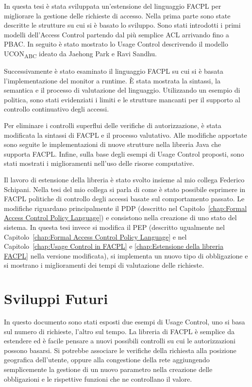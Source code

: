 \label{chap:Conclusioni}
In questa tesi è stata sviluppata un'estensione del linguaggio \ac{FACPL} per migliorare la gestione delle richieste di accesso.
Nella prima parte sono state descritte le strutture su cui si è basato lo sviluppo. Sono stati introdotti i primi modelli
dell'Access Control partendo dal più semplice \ac{ACL} arrivando fino a \ac{PBAC}. In seguito è stato mostrato lo Usage Control
descrivendo il modello UCON\textsubscript{ABC} ideato da Jaehong Park e Ravi Sandhu.

Successivamente è stato esaminato il linguaggio \ac{FACPL} su cui si è basata l'implementazione del monitor a runtime.
\MakeUppercase{è} stata mostrata la sintassi, la semantica e il processo di valutazione del linguaggio.
Utilizzando un esempio di politica, sono stati evidenziati i limiti e le strutture mancanti per
il supporto al controllo continuativo degli accessi.

Per eliminare i controlli superflui delle verifiche di autorizzazione, è stata modificata la sintassi di \ac{FACPL}
e il processo valutativo.
Alle modifiche apportate sono seguite le implementazioni di nuove strutture nella libreria Java
che supporta \ac{FACPL}.
Infine, sulla base degli esempi di Usage Control proposti, sono stati mostrati i miglioramenti nell'uso delle
risorse computative.

Il lavoro di estensione della libreria è stato svolto insieme al mio collega Federico Schipani. Nella tesi del
mio collega si parla di come è stato possibile esprimere in \ac{FACPL} politiche di controllo degli accessi basate
sul comportamento passato. Le modifiche riguardano principalmente il \ac{PDP} (descritto nel Capitolo~\ref{chap:Formal Access Control Policy Language})
e consistono nella creazione di uno stato del sistema. In questa tesi invece si modifica il \ac{PEP}
(descritto ugualmente nel Capitolo~\ref{chap:Formal Access Control Policy Language}
e nel Capitolo~\ref{chap:Usage Control in FACPL} e \ref{chap:Estensione della libreria FACPL} nella versione modificata),
si implementa un nuovo tipo di obbligazione e si mostrano i miglioramenti dei tempi di valutazione delle richieste.
\section{Sviluppi Futuri}
\label{sec:Sviluppi Futuri}
In questo documento sono stati esposti due esempi di Usage Control, uno si basa sul numero di richieste, l'altro sul tempo.
La libreria di \ac{FACPL} è semplice da estendere ed è facile pensare a nuovi possibili controlli su cui
le autorizzazioni possono basarsi. Si potrebbe associare le verifiche della richiesta alla posizione
geografica dell'utente, oppure alla congestione della rete aggiungendo semplicemente la gestione di un nuovo parametro nella
creazione delle obbligazioni e le rispettive funzioni che ne controllano il valore.
